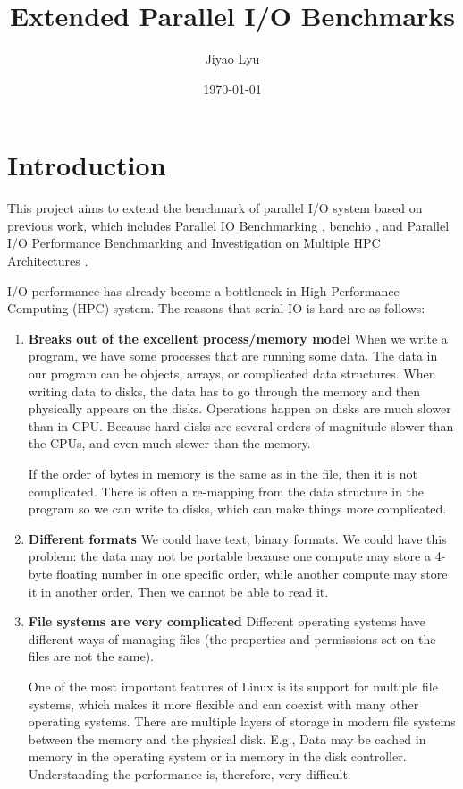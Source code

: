 \documentclass{article}
\begin{document}

\title{Extended Parallel I/O Benchmarks}
\author{Jiyao Lyu}
\date{\today}

\makeEPCCtitle

\newpage

\tableofcontents

\newpage
{}

\section{Introduction}

This project aims to extend the benchmark of parallel I/O system based on previous work, which includes Parallel IO Benchmarking \cite{ref:Wu}, benchio \cite{ref:benchio}, and Parallel I/O Performance Benchmarking and Investigation on Multiple HPC Architectures \cite{ref:archer}.

I/O performance has already become a bottleneck in High-Performance Computing (HPC) system. The reasons that serial IO is hard are as follows:

\begin{enumerate}
	\item \textbf{Breaks out of the excellent process/memory model}
	When we write a program, we have some processes that are running some data. The data in our program can be objects, arrays, or complicated data structures. When writing data to disks, the data has to go through the memory and then physically appears on the disks. Operations happen on disks are much slower than in CPU. Because hard disks are several orders of magnitude slower than the CPUs, and even much slower than the memory.

	If the order of bytes in memory is the same as in the file, then it is not complicated. There is often a re-mapping from the data structure in the program so we can write to disks, which can make things more complicated.
	\item \textbf{Different formats}
	We could have text, binary formats. We could have this problem: the data may not be portable because one compute may store a 4-byte floating number in one specific order, while another compute may store it in another order. Then we cannot be able to read it.
	\item \textbf{File systems are very complicated}
	Different operating systems have different ways of managing files (the properties and permissions set on the files are not the same).
	
    One of the most important features of Linux is its support for multiple file systems, which makes it more flexible and can coexist with many other operating systems.
    There are multiple layers of storage in modern file systems between the memory and the physical disk. E.g., Data may be cached in memory in the operating system or in memory in the disk controller. Understanding the performance is, therefore, very difficult.
\end{enumerate}
\end{document}
